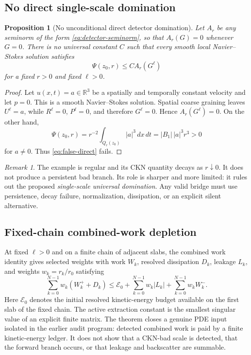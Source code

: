 \documentclass[11pt]{article}
\numberwithin{equation}{section}
\newtheorem{proposition}[theorem]{Proposition}
\theoremstyle{remark}
\newtheorem{remark}[theorem]{Remark}
\newcommand{\R}{\mathbb R}
\newcommand{\dxdt}{\,dx\,dt}
\newcommand{\calE}{\mathcal E}
\begin{document}
\subsection{No direct single-scale domination}

\begin{proposition}[No unconditional direct detector domination]\label{prop:no-direct}
Let $A_r$ be any seminorm of the form \eqref{eq:detector-seminorm}, so that $A_r(G)=0$ whenever $G=0$. There is no universal constant $C$ such that every smooth local Navier--Stokes solution satisfies
\begin{equation}\label{eq:false-direct}
\Psi(z_0,r)\le C A_r(G^\ell)
\end{equation}
for a fixed $r>0$ and fixed $\ell>0$.
\end{proposition}

\begin{proof}
Let $u(x,t)=a\in\R^3$ be a spatially and temporally constant velocity and let $p=0$. This is a smooth Navier--Stokes solution. Spatial coarse graining leaves $U^\ell=a$, while $R^\ell=0$, $P^\ell=0$, and therefore $G^\ell=0$. Hence $A_r(G^\ell)=0$. On the other hand,
\[
\Psi(z_0,r)
=r^{-2}\int_{Q_r(z_0)}|a|^3\dxdt
=|B_1|\,|a|^3r^3>0
\]
for $a\ne0$. Thus \eqref{eq:false-direct} fails.
\end{proof}

\begin{remark}
The example is regular and its CKN quantity decays as $r\downarrow0$. It does not produce a persistent bad branch. Its role is sharper and more limited: it rules out the proposed \emph{single-scale universal domination}. Any valid bridge must use persistence, decay failure, normalization, dissipation, or an explicit silent alternative.
\end{remark}

\subsection{Fixed-chain combined-work depletion}

At fixed $\ell>0$ and on a finite chain of adjacent slabs, the combined work identity gives selected weights with work $W_k$, resolved dissipation $D_k$, leakage $L_k$, and weights $w_k=r_k/r_0$ satisfying
\begin{equation}\label{eq:work-depletion}
\sum_{k=0}^{N-1}w_k(W_k^++D_k)
\le
\calE_0
+
\sum_{k=0}^{N-1}w_k|L_k|
+
\sum_{k=0}^{N-1}w_kW_k^-.
\end{equation}
Here $\calE_0$ denotes the initial resolved kinetic-energy budget available on the first slab of the fixed chain.
The active extraction constant is the smallest singular value of an explicit finite matrix. The theorem closes a genuine PDE input isolated in the earlier audit program: detected combined work is paid by a finite kinetic-energy ledger. It does not show that a CKN-bad scale is detected, that the forward branch occurs, or that leakage and backscatter are summable.
\end{document}
